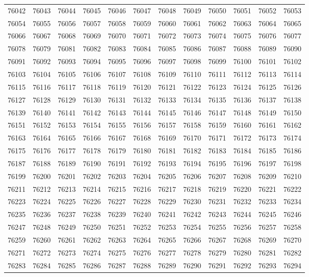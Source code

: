 \begin{center}
\begin{longtable}{llllllllllll}
76042 &76043 &76044 &76045 &76046 &76047 &76048 &76049 &76050 &76051 &76052 &76053 \\
76054 &76055 &76056 &76057 &76058 &76059 &76060 &76061 &76062 &76063 &76064 &76065 \\
76066 &76067 &76068 &76069 &76070 &76071 &76072 &76073 &76074 &76075 &76076 &76077 \\
76078 &76079 &76081 &76082 &76083 &76084 &76085 &76086 &76087 &76088 &76089 &76090 \\
76091 &76092 &76093 &76094 &76095 &76096 &76097 &76098 &76099 &76100 &76101 &76102 \\
76103 &76104 &76105 &76106 &76107 &76108 &76109 &76110 &76111 &76112 &76113 &76114 \\
76115 &76116 &76117 &76118 &76119 &76120 &76121 &76122 &76123 &76124 &76125 &76126 \\
76127 &76128 &76129 &76130 &76131 &76132 &76133 &76134 &76135 &76136 &76137 &76138 \\
76139 &76140 &76141 &76142 &76143 &76144 &76145 &76146 &76147 &76148 &76149 &76150 \\
76151 &76152 &76153 &76154 &76155 &76156 &76157 &76158 &76159 &76160 &76161 &76162 \\
76163 &76164 &76165 &76166 &76167 &76168 &76169 &76170 &76171 &76172 &76173 &76174 \\
76175 &76176 &76177 &76178 &76179 &76180 &76181 &76182 &76183 &76184 &76185 &76186 \\
76187 &76188 &76189 &76190 &76191 &76192 &76193 &76194 &76195 &76196 &76197 &76198 \\
76199 &76200 &76201 &76202 &76203 &76204 &76205 &76206 &76207 &76208 &76209 &76210 \\
76211 &76212 &76213 &76214 &76215 &76216 &76217 &76218 &76219 &76220 &76221 &76222 \\
76223 &76224 &76225 &76226 &76227 &76228 &76229 &76230 &76231 &76232 &76233 &76234 \\
76235 &76236 &76237 &76238 &76239 &76240 &76241 &76242 &76243 &76244 &76245 &76246 \\
76247 &76248 &76249 &76250 &76251 &76252 &76253 &76254 &76255 &76256 &76257 &76258 \\
76259 &76260 &76261 &76262 &76263 &76264 &76265 &76266 &76267 &76268 &76269 &76270 \\
76271 &76272 &76273 &76274 &76275 &76276 &76277 &76278 &76279 &76280 &76281 &76282 \\
76283 &76284 &76285 &76286 &76287 &76288 &76289 &76290 &76291 &76292 &76293 &76294 \\

\end{longtable}
\end{center}
